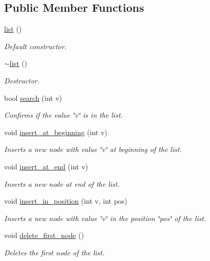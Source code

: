 \subsection*{Public Member Functions}
\begin{DoxyCompactItemize}
\item 
\hyperlink{classlist_a223ecca7c96ef287c1e647493a32fbf6}{list} ()
\begin{DoxyCompactList}\small\item\em Default constructor. \end{DoxyCompactList}\item 
\hyperlink{classlist_a72eaabb03a048506432f8d167db12524}{$\sim$list} ()
\begin{DoxyCompactList}\small\item\em Destructor. \end{DoxyCompactList}\item 
bool \hyperlink{classlist_a7ad1d4788bef2d9ccb1827ed1576eb4e}{search} (int v)
\begin{DoxyCompactList}\small\item\em Confirms if the value \char`\"{}v\char`\"{} is in the list. \end{DoxyCompactList}\item 
void \hyperlink{classlist_a69b02d50b1ec180ca86003eefc427bef}{insert\-\_\-at\-\_\-beginning} (int v)
\begin{DoxyCompactList}\small\item\em Inserts a new node with value \char`\"{}v\char`\"{} at beginning of the list. \end{DoxyCompactList}\item 
void \hyperlink{classlist_a0aa6499aab860dccd290638f1db18148}{insert\-\_\-at\-\_\-end} (int v)
\begin{DoxyCompactList}\small\item\em Inserts a new node at end of the list. \end{DoxyCompactList}\item 
void \hyperlink{classlist_ac6ae86ceba69b3d9930925e826533fe6}{insert\-\_\-in\-\_\-position} (int v, int pos)
\begin{DoxyCompactList}\small\item\em Inserts a new node with value \char`\"{}v\char`\"{} in the position \char`\"{}pos\char`\"{} of the list. \end{DoxyCompactList}\item 
void \hyperlink{classlist_a9442b8d51977d2e334668c5af309b0a6}{delete\-\_\-first\-\_\-node} ()
\begin{DoxyCompactList}\small\item\em Deletes the first node of the list. \end{DoxyCompactList}\item 

\end{DoxyCompactItemize}
